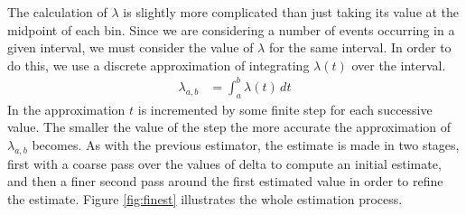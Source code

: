 \documentclass[a4paper,11pt]{article}
\begin{document}
   The calculation of $\lambda$ is slightly more complicated than just taking
   its value at the midpoint of each bin. Since we are considering a number of
   events occurring in a given interval, we must consider the value of $\lambda$
   for the same interval. In order to do this, we use a discrete approximation
   of integrating $\lambda(t)$ over the interval.
   \begin{align}
   \lambda_{a,b}&=\int_a^b\lambda(t)\,dt
   \end{align}
   In the approximation $t$ is incremented by some finite step for each
   successive value. The smaller the value of the step the more accurate the
   approximation of $\lambda_{a,b}$ becomes. As with the previous estimator, the
   estimate is made in two stages, first with a coarse pass over the values of
   delta to compute an initial estimate, and then a finer second pass around the
   first estimated value in order to refine the estimate. Figure
   \ref{fig:finest} illustrates the whole estimation process.
\end{document}
